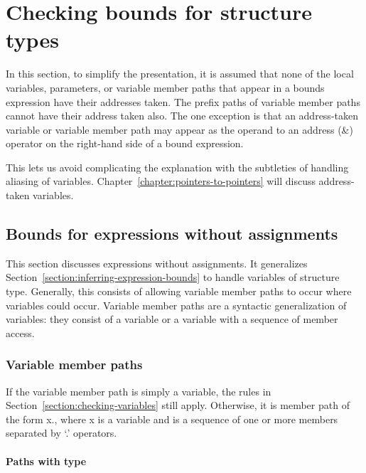 
\chapter{Checking bounds for structure types}
\label{chapter:checking-structure-bounds}

In this section, to simplify the presentation, it is assumed that none
of the local variables, parameters, or variable member paths that appear
in a bounds expression have their addresses taken. The prefix paths of
variable member paths cannot have their address taken also. The one
exception is that an address-taken variable or variable member path may
appear as the operand to an address (\&) operator on the right-hand side
of a bound expression.

This lets us avoid complicating the explanation with the subtleties of
handling aliasing of variables. Chapter~\ref{chapter:pointers-to-pointers}
will discuss address-taken variables.

\section{Bounds for expressions without assignments}\label{bounds-for-expressions-without-assignments}

This section discusses expressions without assignments. It generalizes
Section~\ref{section:inferring-expression-bounds}
to handle variables of structure type. Generally, this
consists of allowing variable member paths to occur where variables
could occur. Variable member paths are a syntactic generalization of
variables: they consist of a variable or a variable with a sequence of
member access.

\subsection{Variable member paths}\label{variable-member-paths}

If the variable member path is simply a variable, the rules in
Section~\ref{section:checking-variables}
 still apply. Otherwise, it is member path of the form
x., where x is a variable and  is a sequence of
one or more members separated by `.' operators.

\subsubsection{Paths with type \arrayptr}\label{paths-with-type-arrayux5fptr}

